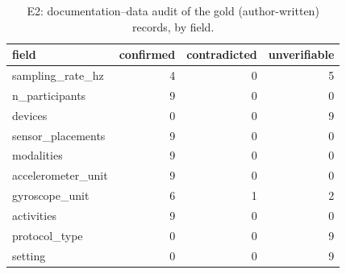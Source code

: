 \begin{table}
\caption{E2: documentation–data audit of the gold (author-written) records, by field.}
\label{tab:T3_audit_gold_by_field}
\begin{tabular}{lrrr}
\toprule
field & confirmed & contradicted & unverifiable \\
\midrule
sampling\_rate\_hz & 4 & 0 & 5 \\
n\_participants & 9 & 0 & 0 \\
devices & 0 & 0 & 9 \\
sensor\_placements & 9 & 0 & 0 \\
modalities & 9 & 0 & 0 \\
accelerometer\_unit & 9 & 0 & 0 \\
gyroscope\_unit & 6 & 1 & 2 \\
activities & 9 & 0 & 0 \\
protocol\_type & 0 & 0 & 9 \\
setting & 0 & 0 & 9 \\
\bottomrule
\end{tabular}
\end{table}
